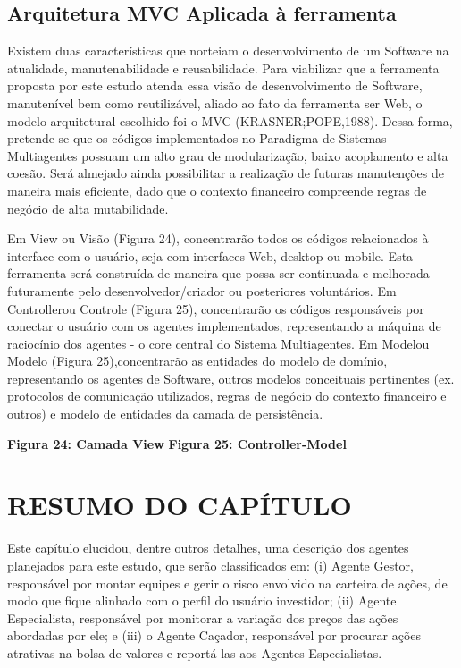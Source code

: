 \subsection{Arquitetura MVC Aplicada à ferramenta}

Existem duas características que norteiam o desenvolvimento de um Software na atualidade, manutenabilidade e reusabilidade. Para viabilizar que a ferramenta proposta por este estudo atenda essa visão de desenvolvimento de Software, manutenível bem como reutilizável, aliado ao fato da ferramenta ser Web, o modelo arquitetural escolhido foi o MVC (KRASNER;POPE,1988). Dessa forma, pretende-se que os códigos implementados no Paradigma de Sistemas Multiagentes possuam um alto grau de modularização, baixo acoplamento e alta coesão. Será almejado ainda possibilitar a realização de futuras manutenções de maneira mais eficiente, dado que o contexto financeiro compreende regras de negócio de alta mutabilidade. 

Em View ou Visão (Figura 24), concentrarão todos os códigos relacionados à interface com o usuário, seja com interfaces Web, desktop ou mobile. Esta ferramenta será construída de maneira que possa ser continuada e melhorada futuramente pelo desenvolvedor/criador ou posteriores voluntários. Em Controllerou Controle (Figura 25), concentrarão os códigos responsáveis por conectar o usuário com os agentes implementados, representando a máquina de raciocínio dos agentes - o core central do Sistema Multiagentes. Em Modelou Modelo (Figura 25),concentrarão as entidades do modelo de domínio, representando os agentes de Software, outros modelos conceituais pertinentes (ex. protocolos de comunicação utilizados, regras de negócio do contexto financeiro e outros) e modelo de entidades da camada de persistência.

\textbf{Figura 24: Camada View}
\textbf{Figura 25: Controller-Model}


\section{RESUMO DO CAPÍTULO}

Este capítulo elucidou, dentre outros detalhes, uma descrição dos agentes planejados para este estudo, que serão classificados em: (i) Agente Gestor, responsável por montar equipes e gerir o risco envolvido na carteira de ações, de modo que fique alinhado com o perfil do usuário investidor; (ii) Agente Especialista, responsável por monitorar a variação dos preços das ações abordadas por ele; e (iii) o Agente Caçador, responsável por procurar ações atrativas na bolsa de valores e reportá-las aos Agentes Especialistas.

